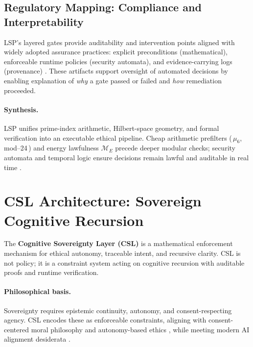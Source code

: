 \documentclass[12pt]{amsart}
\theoremstyle{plain}
\begin{document}
\subsection{Regulatory Mapping: Compliance and Interpretability}
\noindent LSP’s layered gates provide auditability and intervention points aligned with widely adopted assurance practices: explicit preconditions (mathematical), enforceable runtime policies (security automata), and evidence-carrying logs (provenance) \cite{schneider2000enforceable,clarke1999model,baier2008model}. These artifacts support oversight of automated decisions by enabling explanation of \emph{why} a gate passed or failed and \emph{how} remediation proceeded.

\paragraph{Synthesis.}
LSP unifies prime-index arithmetic, Hilbert-space geometry, and formal verification into an executable ethical pipeline. Cheap arithmetic prefilters (\,$\mu_6$, mod–24\,) and energy lawfulness $\mathcal{M}_E$ precede deeper modular checks; security automata and temporal logic ensure decisions remain lawful and auditable in real time \cite{hardy2008introduction,cover2006elements,schneider2000enforceable,clarke1999model,baier2008model}.
\section{CSL Architecture: Sovereign Cognitive Recursion}

\noindent The \textbf{Cognitive Sovereignty Layer (CSL)} is a mathematical enforcement mechanism for ethical autonomy, traceable intent, and recursive clarity. CSL is not policy; it is a constraint system acting on cognitive recursion with auditable proofs and runtime verification.

\paragraph{Philosophical basis.}
Sovereignty requires epistemic continuity, autonomy, and consent-respecting agency. CSL encodes these as enforceable constraints, aligning with consent-centered moral philosophy and autonomy-based ethics \cite{scanlon1998what,kant1997groundwork}, while meeting modern AI alignment desiderata \cite{amodei2016concrete,gabriel2020artificial}.
\end{document}

